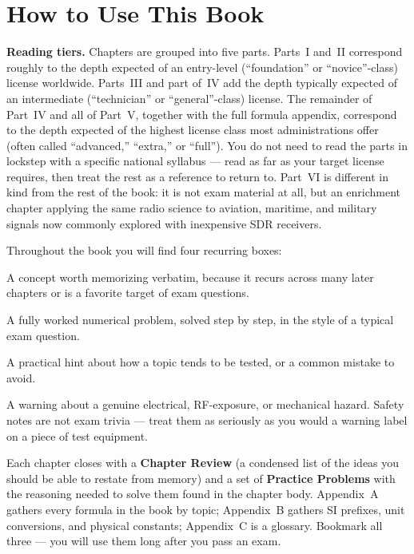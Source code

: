 \chapter*{How to Use This Book}

\textbf{Reading tiers.} Chapters are grouped into five parts. Parts~I and~II
correspond roughly to the depth expected of an entry-level (``foundation''
or ``novice''-class) license worldwide. Parts~III and part of~IV add the
depth typically expected of an intermediate (``technician'' or
``general''-class) license. The remainder of Part~IV and all of Part~V,
together with the full formula appendix, correspond to the depth expected
of the highest license class most administrations offer (often called
``advanced,'' ``extra,'' or ``full''). You do not need to read the parts
in lockstep with a specific national syllabus --- read as far as your
target license requires, then treat the rest as a reference to return to.
Part~VI is different in kind from the rest of the book: it is not exam
material at all, but an enrichment chapter applying the same radio
science to aviation, maritime, and military signals now commonly
explored with inexpensive SDR receivers.

\medskip
\noindent Throughout the book you will find four recurring boxes:

\begin{keyidea}
A concept worth memorizing verbatim, because it recurs across many later
chapters or is a favorite target of exam questions.
\end{keyidea}

\begin{examplebox}
A fully worked numerical problem, solved step by step, in the style of a
typical exam question.
\end{examplebox}

\begin{examtip}
A practical hint about how a topic tends to be tested, or a common mistake
to avoid.
\end{examtip}

\begin{safetynote}
A warning about a genuine electrical, RF-exposure, or mechanical hazard.
Safety notes are not exam trivia --- treat them as seriously as you would
a warning label on a piece of test equipment.
\end{safetynote}

\medskip
\noindent Each chapter closes with a \textbf{Chapter Review} (a condensed
list of the ideas you should be able to restate from memory) and a set of
\textbf{Practice Problems} with the reasoning needed to solve them found in
the chapter body. Appendix~A gathers every formula in the book by topic;
Appendix~B gathers SI prefixes, unit conversions, and physical constants;
Appendix~C is a glossary. Bookmark all three --- you will use them long
after you pass an exam.
